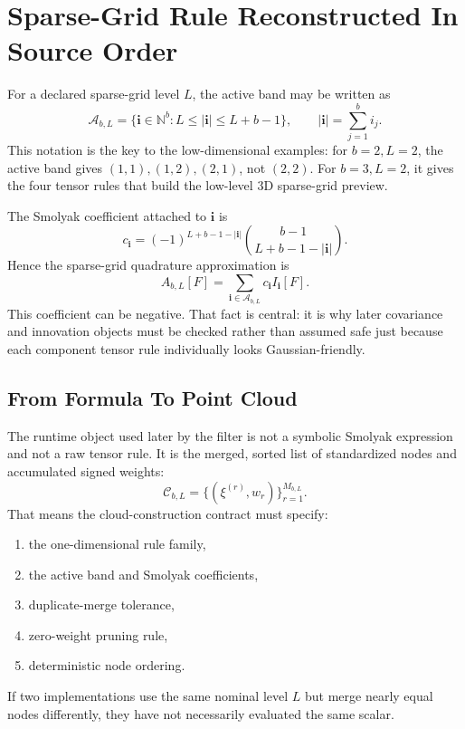 \section{Sparse-Grid Rule Reconstructed In Source Order}
\label{sec:p31-sgq-reconstruction}

For a declared sparse-grid level \(L\), the active band may be written as
\begin{equation}
  \mathcal A_{b,L}
  =
  \{\mathbf i\in\mathbb N^b: L\le |\mathbf i|\le L+b-1\},
  \qquad |\mathbf i|=\sum_{j=1}^b i_j.
  \label{eq:p31-level-band}
\end{equation}
This notation is the key to the low-dimensional examples: for \(b=2,L=2\), the
active band gives \((1,1),(1,2),(2,1)\), not \((2,2)\).  For \(b=3,L=2\), it
gives the four tensor rules that build the low-level 3D sparse-grid preview.

The Smolyak coefficient attached to \(\mathbf i\) is
\begin{equation}
  c_{\mathbf i}
  =
  (-1)^{L+b-1-|\mathbf i|}
  \binom{b-1}{L+b-1-|\mathbf i|}.
  \label{eq:p31-smolyak-coeff}
\end{equation}
Hence the sparse-grid quadrature approximation is
\begin{equation}
  A_{b,L}[F]
  =
  \sum_{\mathbf i\in\mathcal A_{b,L}} c_{\mathbf i}I_{\mathbf i}[F].
  \label{eq:p31-smolyak-rule}
\end{equation}
This coefficient can be negative.  That fact is central: it is why later
covariance and innovation objects must be checked rather than assumed safe just
because each component tensor rule individually looks Gaussian-friendly.

\subsection{From Formula To Point Cloud}
\label{subsec:p32-cloud-construction}

The runtime object used later by the filter is not a symbolic Smolyak
expression and not a raw tensor rule.  It is the merged, sorted list of
standardized nodes and accumulated signed weights:
\begin{equation}
  \mathcal C_{b,L}
  =
  \{(\xi^{(r)},w_r)\}_{r=1}^{M_{b,L}}.
  \label{eq:p31-fixed-cloud}
\end{equation}
That means the cloud-construction contract must specify:
\begin{enumerate}[leftmargin=0.28in]
  \item the one-dimensional rule family,
  \item the active band and Smolyak coefficients,
  \item duplicate-merge tolerance,
  \item zero-weight pruning rule,
  \item deterministic node ordering.
\end{enumerate}
If two implementations use the same nominal level \(L\) but merge nearly equal
nodes differently, they have not necessarily evaluated the same scalar.


